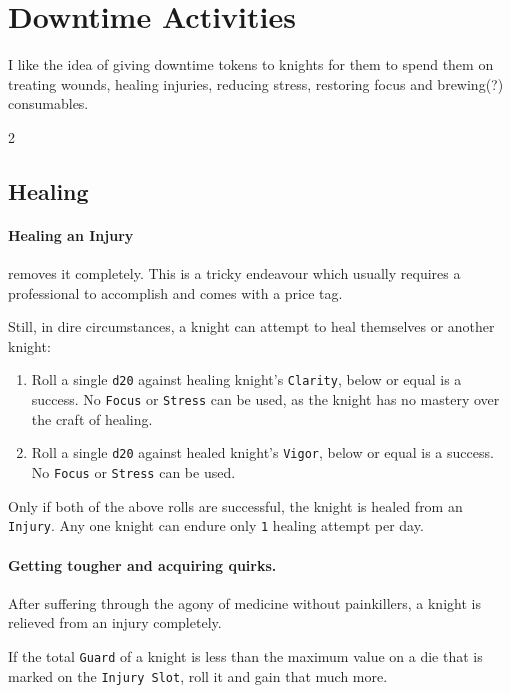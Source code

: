 \documentclass{osr-template/zine}
\begin{document}
\newpage
\section*{\centering \fontsize{35}{45}\selectfont Downtime Activities} \label{sec:downtime}
\vspace*{0.4 cm}

I like the idea of giving downtime tokens to knights for them to spend them on treating wounds, healing injuries, reducing stress, restoring focus and brewing(?) consumables.

\begin{multicols*}{2}

\subsection*{Healing}

\paragraph{Healing an Injury} removes it completely.
This is a tricky endeavour which usually requires a professional to accomplish and comes with a price tag.

Still, in dire circumstances, a knight can attempt to heal themselves or another knight:
\begin{enumerate}[nosep, leftmargin=*]
    \item Roll a single \texttt{d20} against healing knight's \texttt{Clarity}, below or equal is a success. No \texttt{Focus} or \texttt{Stress} can be used, as the knight has no mastery over the craft of healing.
    \item Roll a single \texttt{d20} against healed knight's \texttt{Vigor}, below or equal is a success. No \texttt{Focus} or \texttt{Stress} can be used.
\end{enumerate}

Only if both of the above rolls are successful, the knight is healed from an \texttt{Injury}.
Any one knight can endure only \texttt{1} healing attempt per day.

\paragraph{Getting tougher and acquiring quirks.} After suffering through the agony of medicine without painkillers, a knight is relieved from an injury completely.

If the total \texttt{Guard} of a knight is less than the maximum value on a die that is marked on the \texttt{Injury Slot}, roll it and gain that much more.


\end{multicols*}
\end{document}
